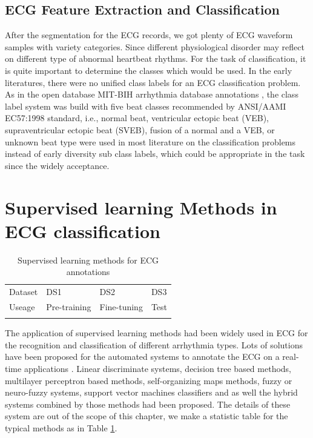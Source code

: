 \documentclass[graybox]{svmult}
\begin{document}
\subsection{ECG Feature Extraction and Classification}
After the segmentation for the ECG records, we got plenty of ECG waveform samples with variety categories. Since different physiological disorder may reflect on different type of abnormal heartbeat rhythms. For the task of classification, it is quite important to determine the classes which would be used. In the early literatures, there were no unified class labels for an ECG classification problem. As in the open database MIT-BIH arrhythmia database annotations \cite{mark1982annotated, moody1990bih}, the class label system was build with five beat classes recommended by ANSI/AAMI EC57:1998 standard, i.e., normal beat, ventricular ectopic beat (VEB), supraventricular ectopic beat (SVEB), fusion of a normal and a VEB, or unknown beat type were used in most literature on the classification problems instead of early diversity sub class labels, which could be appropriate in the task since the widely acceptance. 


\section{Supervised learning Methods in ECG classification}

\begin{table}
\caption{Supervised learning methods for ECG annotations}
\label{tab:0}       %
%
%
\begin{tabular}{p{2.9cm}p{2.8cm}p{2.8cm}p{2.8cm}}
\hline\noalign{\smallskip}
Dataset & DS1 & DS2 & DS3   \\

\noalign{\smallskip}\svhline\noalign{\smallskip}
Useage & Pre-training & Fine-tuning & Test   \\


\noalign{\smallskip}\hline\noalign{\smallskip}
\end{tabular}
\end{table}

The application of supervised learning methods had been widely used in ECG for the recognition and classification of different arrhythmia types.
Lots of solutions have been proposed for the automated systems to annotate the ECG on a real-time applications \cite{osowski2001ecg}. 
Linear discriminate systems, decision tree based methods, multilayer perceptron based methods, self-organizing maps methods, fuzzy or neuro-fuzzy systems, support vector machines classifiers and as well the hybrid systems combined by those methods had been proposed. The details of these system are out of the scope of this chapter, we make a statistic table for the typical methods as in Table \ref{tab:0}.
\end{document}
